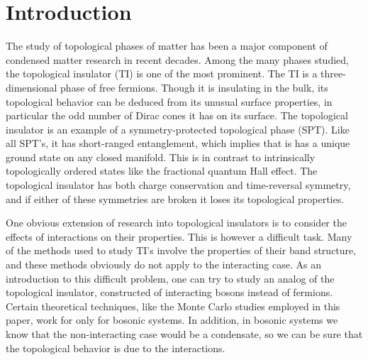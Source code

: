 \documentclass[prb,twocolumn]{revtex4-1}
\begin{document}
\title{}
\date{\today}
\pacs{}

\author{Scott D. Geraedts}
\author{Olexei I. Motrunich}

\begin{abstract}
\end{abstract}
\maketitle

\section{Introduction}
The study of topological phases of matter has been a major component of condensed matter research in recent decades. Among the many phases studied, the topological insulator (TI) is one of the most prominent. The TI is a three-dimensional phase of free fermions. Though it is insulating in the bulk, its topological behavior can be deduced from its unusual surface properties, in particular the odd number of Dirac cones it has on its surface. The topological insulator is an example of a symmetry-protected topological phase (SPT). Like all SPT's, it has short-ranged entanglement, which implies that is has a unique ground state on any closed manifold. This is in contrast to intrinsically topologically ordered states like the fractional quantum Hall effect. The topological insulator has both charge conservation and time-reversal symmetry, and if either of these symmetries are broken it loses its topological properties.

One obvious extension of research into topological insulators is to consider the effects of interactions on their properties. This is however a difficult task. Many of the methods used to study TI's involve the properties of their band structure, and these methods obviously do not apply to the interacting case. As an introduction to this difficult problem, one can try to study an analog of the topological insulator, constructed of interacting bosons instead of fermions. Certain theoretical techniques, like the Monte Carlo studies employed in this paper, work for only for bosonic systems. In addition, in bosonic systems we know that the non-interacting case would be a condensate, so we can be sure that the topological behavior is due to the interactions.
\end{document}
